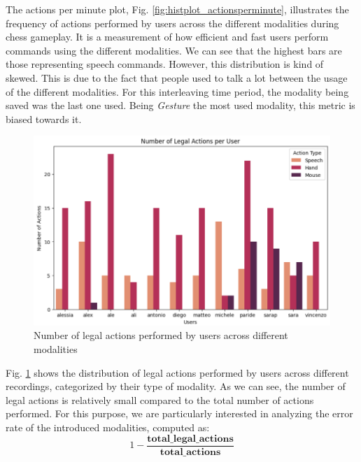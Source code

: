 \documentclass[a4paper, 11pt, twocolumn]{IEEEtran}
\begin{document}
    The actions per minute plot, Fig. \ref{fig:histplot_actionsperminute}, illustrates the frequency of actions performed by users across the different modalities during chess gameplay. It is a measurement of how efficient and fast users perform commands using the different modalities. We can see that the highest bars are those representing speech commands. However, this distribution is kind of skewed. This is due to the fact that people used to talk a lot between the usage of the different modalities. For this interleaving time period, the modality being saved was the last one used. Being \emph{Gesture} the most used modality, this metric is biased towards it.  
    \begin{figure}
        \centering
        \includegraphics[width=.5\textwidth]{images/legal_actions.png}
        \caption{Number of legal actions performed by users across different modalities}
        \label{fig:histplot_actions}
    \end{figure}
    Fig. \ref{fig:histplot_actions} shows the distribution of legal actions performed by users across different recordings, categorized by their type of modality.   
    As we can see, the number of legal actions is relatively small compared to the total number of actions performed. For this purpose, we are particularly interested in analyzing the error rate of the introduced modalities, computed as: 
    \begin{equation}
        1 - \frac{\mathbf{total\_legal\_actions}}{\mathbf{total\_actions}}
    \end{equation}
\end{document}

